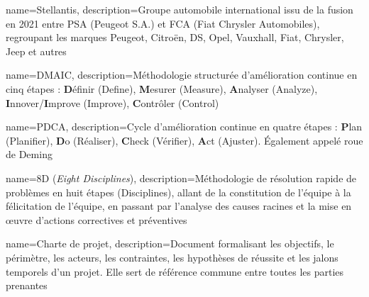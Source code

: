 {
    name=Stellantis,
    description={Groupe automobile international issu de la fusion en 2021 entre PSA (Peugeot S.A.) et FCA (Fiat Chrysler Automobiles), regroupant les marques Peugeot, Citroën, DS, Opel, Vauxhall, Fiat, Chrysler, Jeep et autres}
}

{
    name=DMAIC,
    description={Méthodologie structurée d'amélioration continue en cinq étapes : \textbf{D}éfinir (Define), \textbf{M}esurer (Measure), \textbf{A}nalyser (Analyze), \textbf{I}nnover/\textbf{I}mprove (Improve), \textbf{C}ontrôler (Control)}
}

{
    name=PDCA,
    description={Cycle d'amélioration continue en quatre étapes : \textbf{P}lan (Planifier), \textbf{D}o (Réaliser), \textbf{C}heck (Vérifier), \textbf{A}ct (Ajuster). Également appelé roue de Deming}
}

{
    name=8D (\textit{Eight Disciplines}),
    description={Méthodologie de résolution rapide de problèmes en huit étapes (Disciplines), allant de la constitution de l'équipe à la félicitation de l'équipe, en passant par l'analyse des causes racines et la mise en œuvre d'actions correctives et préventives}
}

{
    name=Charte de projet,
    description={Document formalisant les objectifs, le périmètre, les acteurs, les contraintes, les hypothèses de réussite et les jalons temporels d'un projet. Elle sert de référence commune entre toutes les parties prenantes}
}
